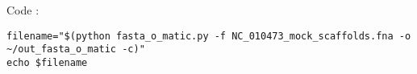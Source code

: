 Code :

\begin{verbatim}
filename="$(python fasta_o_matic.py -f NC_010473_mock_scaffolds.fna -o ~/out_fasta_o_matic -c)"
echo $filename
\end{verbatim}
  
  
  
  
  
  
  
  
  
  